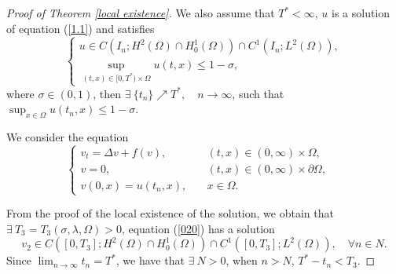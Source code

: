 \documentclass{article}
\numberwithin{equation}{section}
\begin{document}
\begin{proof}[Proof of Theorem \ref{local existence}]
We also assume that $T^*<\infty$, $u$ is a solution of equation (\ref{1.1}) and satisfies
\begin{equation}
\left\{\begin{array}{l}u \in C\left(I_n; H^{2}(\Omega) \cap H_{0}^{1}(\Omega)\right) \cap C^{1}\left(I_n;  L^{2}(\Omega)\right),
\\ \displaystyle\sup _{(t,x) \in [0, T^*) \times\Omega} u(t, x) \le 1-\sigma,\end{array}\right.
\end{equation}
where $\sigma \in(0, 1)$,
then $\exists \ \{t_n\}\nearrow T^*,\quad n\to \infty$, such that $\displaystyle \sup_{x\in \Omega} u(t_n, x)\le 1-\sigma$.

We consider the equation
\begin{equation}
\left\{\begin{array}{lll}
 v_{t}=\Delta v+f(v),\quad & (t,x) \in (0, \infty) \times\Omega,
\\    v=0 ,\quad& (t,x) \in  (0, \infty) \times \partial \Omega 	,
\\  v(0, x)=u(t_n, x) ,\quad& x \in \Omega.
\end{array}\quad \right. \label{020}
\end{equation}

From the proof of the local existence of the solution, we obtain that $\exists\  T_3=T_3(\sigma, \lambda, \Omega)>0$, equation (\ref{020}) has a solution
$$v_2\in C\left([0, T_3]; H^{2}(\Omega) \cap H_{0}^{1}(\Omega)\right) \cap C^{1}\left([0, T_3];  L^{2}(\Omega)\right),\quad \forall n\in N. $$
Since $\displaystyle \lim_{n\to \infty}t_n=T^*$, we have that $\exists\  N>0$, when $n>N$, $T^*-t_n<T_3 $.


\end{proof}
\end{document}
